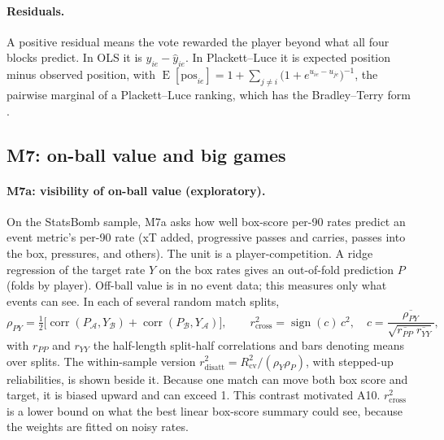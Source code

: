 \documentclass[11pt,a4paper]{article}
\DeclareMathOperator{\corr}{corr}
\DeclareMathOperator{\E}{E}
\begin{document}
\paragraph{Residuals.}
A positive residual means the vote rewarded the player beyond what all four
blocks predict. In OLS it is $y_{ie} - \hat y_{ie}$. In Plackett--Luce it is
expected position minus observed position, with
$\E[\text{pos}_{ie}] = 1 + \sum_{j \ne i} \big(1 + e^{u_{ie} - u_{je}}\big)^{-1}$,
the pairwise marginal of a Plackett--Luce ranking, which has the
Bradley--Terry form \citep{bradley1952paired}.

\subsection{M7: on-ball value and big games}
\label{sec:m7}

\paragraph{M7a: visibility of on-ball value (exploratory).}
On the StatsBomb sample, M7a asks how well box-score per-90 rates predict an
event metric's per-90 rate (xT added, progressive passes and carries, passes
into the box, pressures, and others). The unit is a player-competition. A ridge
regression of the target rate $Y$ on the box rates gives an out-of-fold
prediction $P$ (folds by player). Off-ball value is in no event data; this
measures only what events can see. In each of several random match splits,
\begin{equation}
  \rho_{PY} = \tfrac12\big[\corr(P_{\mathcal A}, Y_{\mathcal B}) + \corr(P_{\mathcal B}, Y_{\mathcal A})\big],
  \qquad
  r^2_{\text{cross}} = \operatorname{sign}(c)\, c^2,
  \quad c = \frac{\overline{\rho_{PY}}}{\sqrt{\overline{r_{PP}}\;\overline{r_{YY}}}},
  \label{eq:visibility}
\end{equation}
with $r_{PP}$ and $r_{YY}$ the half-length split-half correlations and bars
denoting means over splits. The within-sample version
$r^2_{\text{disatt}} = R^2_{\text{cv}} / (\rho_Y \rho_P)$, with stepped-up
reliabilities, is shown beside it. Because one match can move both box score
and target, it is biased upward and can exceed 1. This contrast motivated A10.
$r^2_{\text{cross}}$ is a lower bound on what the best linear box-score
summary could see, because the weights are fitted on noisy rates.
\end{document}
